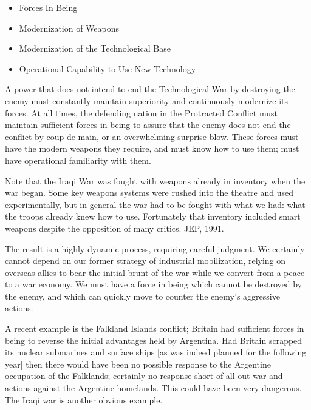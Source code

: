 \begin{itemize}
    \item Forces In Being
    \item Modernization of Weapons
    \item Modernization of the Technological Base
    \item Operational Capability to Use New Technology
\end{itemize}

A power that does not intend to end the Technological War by destroying the enemy must constantly maintain superiority and continuously modernize its forces. At all times, the defending nation in the Protracted Conflict must maintain sufficient forces in being to assure that the enemy does not end the conflict by coup de main, or an overwhelming surprise blow. These forces must have the modern weapons they require, and must know how to use them; must have operational familiarity with them.

\begin{mdframed}[backgroundcolor=black!10]
Note that the Iraqi War was fought with weapons already in inventory when the war began. Some key weapons systems were rushed into the theatre and used experimentally, but in general the war had to be fought with what we had: what the troops already knew how to use. Fortunately that inventory included smart weapons despite the opposition of many critics. JEP, 1991.
\end{mdframed}

The result is a highly dynamic process, requiring careful judgment. We certainly cannot depend on our former strategy of industrial mobilization, relying on overseas allies to bear the initial brunt of the war while we convert from a peace to a war economy. We must have a force in being which cannot be destroyed by the enemy, and which can quickly move to counter the enemy's aggressive actions.

\begin{mdframed}[backgroundcolor=black!10]
A recent example is the Falkland Islands conflict; Britain had sufficient forces in being to reverse the initial advantages held by Argentina. Had Britain scrapped its nuclear submarines and surface ships [as was indeed planned for the following year] then there would have been no possible response to the Argentine occupation of the Falklands; certainly no response short of all-out war and actions against the Argentine homelands. This could have been very dangerous. The Iraqi war is another obvious example.
\end{mdframed}

